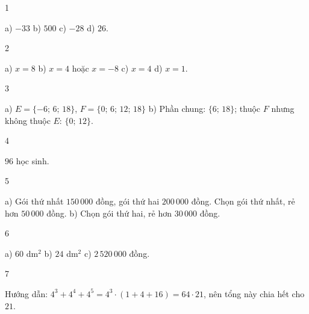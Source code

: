 \begin{Solbook}{1}
 \par \noindent a) $-33$ \hfill b) $500$ \hfill c) $-28$ \hfill d) $26$. \hfill \qedEX 
\end{Solbook}
\begin{Solbook}{2}
 \par \noindent a) $x=8$ \hfill b) $x=4$ hoặc $x=-8$ \hfill c) $x=4$ \hfill d) $x=1$. \hfill \qedEX 
\end{Solbook}
\begin{Solbook}{3}
 \par \noindent a) $E=\{-6;\,6;\,18\}$, $F=\{0;\,6;\,12;\,18\}$ \hfill b) Phần chung: $\{6;\,18\}$; thuộc $F$ nhưng không thuộc $E$: $\{0;\,12\}$. \hfill \qedEX 
\end{Solbook}
\begin{Solbook}{4}
 \par \noindent $96$ học sinh. \hfill \qedEX 
\end{Solbook}
\begin{Solbook}{5}
 \par \noindent a) Gói thứ nhất $150\,000$ đồng, gói thứ hai $200\,000$ đồng. Chọn gói thứ nhất, rẻ hơn $50\,000$ đồng. \hfill b) Chọn gói thứ hai, rẻ hơn $30\,000$ đồng. \hfill \qedEX 
\end{Solbook}
\begin{Solbook}{6}
 \par \noindent a) $60$ dm$^{2}$ \hfill b) $24$ dm$^{2}$ \hfill c) $2\,520\,000$ đồng. \hfill \qedEX 
\end{Solbook}
\begin{Solbook}{7}
 \par \noindent Hướng dẫn: $4^{3}+4^{4}+4^{5}=4^{3}\cdot (1+4+16)=64\cdot 21$, nên tổng này chia hết cho $21$. \hfill \qedEX 
\end{Solbook}
